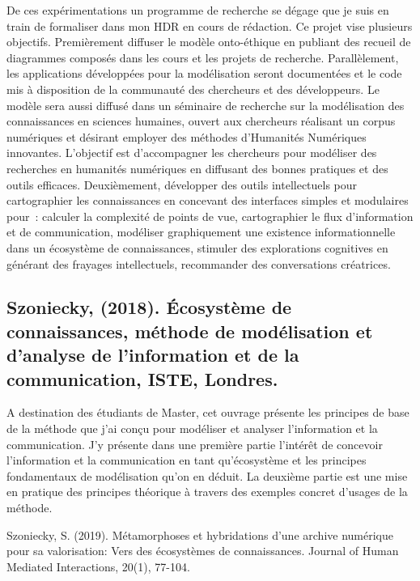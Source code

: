 \documentclass[
  letterpaper,
  DIV=11,
  numbers=noendperiod]{scrreprt}
\begin{document}
De ces expérimentations un programme de recherche se dégage que je suis
en train de formaliser dans mon HDR en cours de rédaction. Ce projet
vise plusieurs objectifs. Premièrement diffuser le modèle onto-éthique
en publiant des recueil de diagrammes composés dans les cours et les
projets de recherche. Parallèlement, les applications développées pour
la modélisation seront documentées et le code mis à disposition de la
communauté des chercheurs et des développeurs. Le modèle sera aussi
diffusé dans un séminaire de recherche sur la modélisation des
connaissances en sciences humaines, ouvert aux chercheurs réalisant un
corpus numériques et désirant employer des méthodes d'Humanités
Numériques innovantes. L'objectif est d'accompagner les chercheurs pour
modéliser des recherches en humanités numériques en diffusant des bonnes
pratiques et des outils efficaces. Deuxièmement, développer des outils
intellectuels pour cartographier les connaissances en concevant des
interfaces simples et modulaires pour~: calculer la complexité de points
de vue, cartographier le flux d'information et de communication,
modéliser graphiquement une existence informationnelle dans un
écosystème de connaissances, stimuler des explorations cognitives en
générant des frayages intellectuels, recommander des conversations
créatrices.

\hypertarget{szoniecky-2018.-uxe9cosystuxe8me-de-connaissances-muxe9thode-de-moduxe9lisation-et-danalyse-de-linformation-et-de-la-communication-iste-londres.}{%
\subsection{Szoniecky, (2018). Écosystème de connaissances, méthode de
modélisation et d'analyse de l'information et de la communication, ISTE,
Londres.}\label{szoniecky-2018.-uxe9cosystuxe8me-de-connaissances-muxe9thode-de-moduxe9lisation-et-danalyse-de-linformation-et-de-la-communication-iste-londres.}}

A destination des étudiants de Master, cet ouvrage présente les
principes de base de la méthode que j'ai conçu pour modéliser et
analyser l'information et la communication. J'y présente dans une
première partie l'intérêt de concevoir l'information et la communication
en tant qu'écosystème et les principes fondamentaux de modélisation
qu'on en déduit. La deuxième partie est une mise en pratique des
principes théorique à travers des exemples concret d'usages de la
méthode.

Szoniecky, S. (2019). Métamorphoses et hybridations d'une archive
numérique pour sa valorisation: Vers des écosystèmes de connaissances.
Journal of Human Mediated Interactions, 20(1), 77-104.
\end{document}
